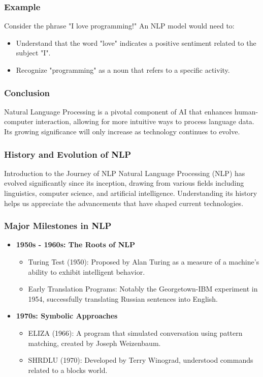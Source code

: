 \documentclass{beamer}
\begin{document}
\begin{frame}[fragile]
    \frametitle{Example}
    
    Consider the phrase "I love programming!" An NLP model would need to:
    \begin{itemize}
        \item Understand that the word "love" indicates a positive sentiment related to the subject "I".
        \item Recognize "programming" as a noun that refers to a specific activity.
    \end{itemize}
\end{frame}

\begin{frame}[fragile]
    \frametitle{Conclusion}
    
    Natural Language Processing is a pivotal component of AI that enhances human-computer interaction, allowing for more intuitive ways to process language data. 
    Its growing significance will only increase as technology continues to evolve.
\end{frame}

\begin{frame}[fragile]
    \frametitle{History and Evolution of NLP}
    \begin{block}{Introduction to the Journey of NLP}
        Natural Language Processing (NLP) has evolved significantly since its inception, drawing from various fields including linguistics, computer science, and artificial intelligence. Understanding its history helps us appreciate the advancements that have shaped current technologies.
    \end{block}
\end{frame}

\begin{frame}[fragile]
    \frametitle{Major Milestones in NLP}
    \begin{itemize}
        \item \textbf{1950s - 1960s: The Roots of NLP}
        \begin{itemize}
            \item Turing Test (1950): Proposed by Alan Turing as a measure of a machine's ability to exhibit intelligent behavior.
            \item Early Translation Programs: Notably the Georgetown-IBM experiment in 1954, successfully translating Russian sentences into English.
        \end{itemize}

        \item \textbf{1970s: Symbolic Approaches}
        \begin{itemize}
            \item ELIZA (1966): A program that simulated conversation using pattern matching, created by Joseph Weizenbaum.
            \item SHRDLU (1970): Developed by Terry Winograd, understood commands related to a blocks world.
        \end{itemize}
    \end{itemize}
\end{frame}
\end{document}
